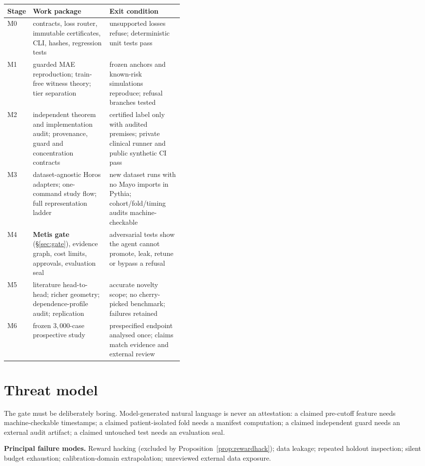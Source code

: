 \documentclass[11pt,a4paper]{article}
\theoremstyle{definition}
\theoremstyle{remark}
\newcommand{\tier}[1]{\textsf{#1}}
\begin{document}
\begin{center}
\small
\begin{tabular}{@{}llp{0.42\linewidth}@{}}
\toprule
Stage & Work package & Exit condition \\
\midrule
M0 & contracts, loss router, immutable certificates, CLI, hashes, regression tests & unsupported losses refuse; deterministic unit tests pass \\
M1 & guarded MAE reproduction; train-free witness theory; tier separation & frozen anchors and known-risk simulations reproduce; refusal branches tested \\
M2 & independent theorem and implementation audit; provenance, guard and concentration contracts & \tier{certified} label only with audited premises; private clinical runner and public synthetic CI pass \\
M3 & dataset-agnostic Horos adapters; one-command study flow; full representation ladder & new dataset runs with no Mayo imports in Pythia; cohort/fold/timing audits machine-checkable \\
M4 & \textbf{Metis gate} (\S\ref{sec:gate}), evidence graph, cost limits, approvals, evaluation seal & adversarial tests show the agent cannot promote, leak, retune or bypass a refusal \\
M5 & literature head-to-head; richer geometry; dependence-profile audit; replication & accurate novelty scope; no cherry-picked benchmark; failures retained \\
M6 & frozen $3{,}000$-case prospective study & prespecified endpoint analysed once; claims match evidence and external review \\
\bottomrule
\end{tabular}
\end{center}

\section{Threat model}\label{sec:threat}

The gate must be deliberately boring. Model-generated natural language is never an attestation: a claimed pre-cutoff feature needs machine-checkable timestamps; a claimed patient-isolated fold needs a manifest computation; a claimed independent guard needs an external audit artifact; a claimed untouched test needs an evaluation seal.

\textbf{Principal failure modes.} Reward hacking (excluded by Proposition~\ref{prop:rewardhack}); data leakage; repeated holdout inspection; silent budget exhaustion; calibration-domain extrapolation; unreviewed external data exposure.
\end{document}
